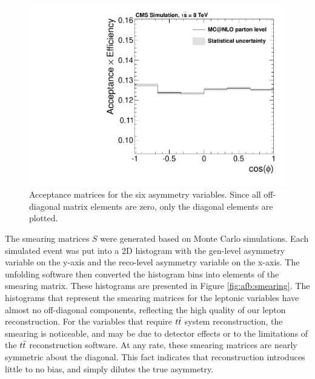 \begin{figure}[htpb]
\includegraphics[width=0.325\linewidth]{figures/accept_lepCosOpeningAngle_all.pdf}
\caption{Acceptance matrices for the six asymmetry variables. Since
  all off-diagonal matrix elements are zero, only the diagonal elements are plotted.}
\label{fig:afb:acceptance}
\end{figure}

The smearing matrices $S$ were generated based on Monte Carlo
simulations. Each simulated event was put into a 2D histogram with the
gen-level asymmetry variable on the y-axis and the reco-level
asymmetry variable on the x-axis. The unfolding software then
converted the histogram bins into elements of the smearing
matrix. These histograms are presented in Figure
\ref{fig:afb:smearing}. The histograms that represent the smearing
matrices for the leptonic variables have almost no off-diagonal
components, reflecting the high quality of our lepton
reconstruction. For the variables that require $t\bar{t}$ system
reconstruction, the smearing is noticeable, and may be due to detector
effects or to the limitations of the $t\bar{t}$ reconstruction
software. At any rate, these smearing matrices are nearly symmetric
about the diagonal. This fact indicates that reconstruction introduces
little to no bias, and simply dilutes the true asymmetry.


